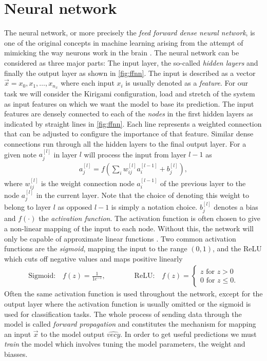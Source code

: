 \section{Neural network}
The neural network, or more precisely the \textit{feed forward dense neural
network}, is one of the original concepts in machine learning arising from the attempt of mimicking the way neurons work in the brain \cite{lederer2021activation, Shankar_2022}. The neural network can be considered as three major parts: The input layer, the
so-called \textit{hidden layers} and finally the output layer as shown in
\cref{fig:ffnn}. The input is described as a vector $\vec{x} = x_0, x_1, \ldots,
x_{n_x}$ where each input $x_i$ is usually denoted as a \textit{feature}. For
our task we will consider the Kirigami configuration, load and stretch of the system as input features on which we want the model to base its prediction. The
input features are densely connected to each of the \textit{nodes} in the first
hidden layers as indicated by straight lines in \cref{fig:ffnn}. Each line
represents a weighted connection that can be adjusted to configure the
importance of that feature. Similar dense connections run through all the
hidden layers to the final output layer. For a given note $a_j^{[l]}$ in layer $l$ will process the input from layer $l-1$ as
\begin{align*}
  a_j^{[l]} = f\left(\sum_i w^{[l]}_{ij}a_i^{[l-1]} + b_j^{[l]}\right),
\end{align*}
where $w^{[l]}_{ij}$ is the weight connection node $a_i^{[l-1]}$ of the previous layer to the node $a_j^{[l]}$ in the current layer. Note that the choice of denoting this weight to belong to layer $l$ as opposed $l-1$ is simply a notation choice. $b_j^{[l]}$ denotes a bias and $f(\cdot)$ the \textit{activation function}. The activation function is often chosen to give a non-linear mapping of the input to each node. Without this, the network will only be capable of approximate linear functions \cite{lederer2021activation}. Two common activation functions are the \textit{sigmoid}, mapping the input to the range $(0,1)$, and the ReLU which cuts off negative values and maps positive linearly
\begin{align*}
  \text{Sigmoid:} \quad f(z) = \frac{1}{1 e^{-z}}, \qquad \qquad
  \text{ReLU:} \quad 
  f(z)= \begin{cases}
    z \text{ for } z > 0   \\
    0 \text{ for } z \leq 0.
    \end{cases}
\end{align*}
Often the same activation function is used throughout the network, except for the output layer where the activation function is usually omitted or the sigmoid is used for classification tasks. The whole process of sending data through the model is called \textit{forward propagation} and constitutes the mechanism for mapping an input $\vec{x}$ to the model output $\hat{vec{y}}$. In order to get useful predictions we must \textit{train} the model which involves tuning the model parameters, the weight and biasses.



